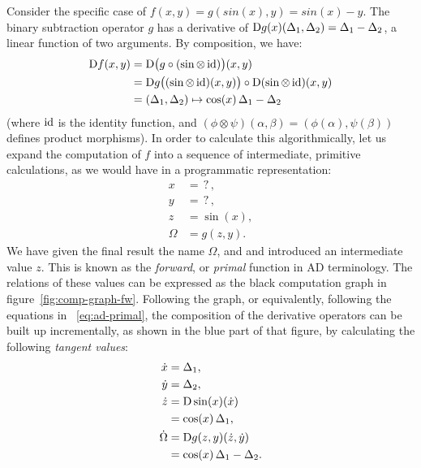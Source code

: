 Consider the specific case of \(f(x, y) = g(sin(x), y) = sin(x) - y\). The binary subtraction
operator \(g\) has a derivative of \(\mathop{}\!\mathrm{D} g(x)(\Delta_1, \Delta_2) = \Delta_1 - \Delta_2\), a linear
function of two arguments.  By composition, we have:
\begin{equation}
  \begin{aligned}
    \mathop{}\!\mathrm{D} f(x, y) &= \mathop{}\!\mathrm{D} \big( g \circ (\sin \otimes \operatorname{id}) \big)(x, y) \\
    &= \mathop{}\!\mathrm{D} g\big( (\sin \otimes \operatorname{id})(x, y) \big) \circ \mathop{}\!\mathrm{D}(\sin \otimes \operatorname{id})(x, y) \\
    &= (\Delta_1, \Delta_2) \mapsto \cos(x) \, \Delta_1 - \Delta_2
  \end{aligned}
\end{equation}
(where \(\operatorname{id}\) is the identity function, and
\((\phi \otimes \psi)(\alpha, \beta) = (\phi(\alpha), \psi(\beta))\) defines product morphisms).  In
order to calculate this algorithmically, let us expand the computation of \(f\) into a sequence of
intermediate, primitive calculations, as we would have in a programmatic representation:
\begin{equation}
  \label{eq:ad-primal}
  \begin{aligned}
    x &= \operatorname{?}, \\
    y &= \operatorname{?}, \\
    z &= \sin(x), \\
    \Omega &= g(z, y).
  \end{aligned}
\end{equation}
We have given the final result the name \(\Omega\), and and introduced an intermediate value \(z\).
This is known as the \emph{forward}, or \emph{primal} function in AD terminology.  The relations of
these values can be expressed as the black computation graph in figure~\ref{fig:comp-graph-fw}.
Following the graph, or equivalently, following the equations in ~\eqref{eq:ad-primal}, the
composition of the derivative operators can be built up incrementally, as shown in the blue part of
that figure, by calculating the following \emph{tangent values}:
\begin{equation}
  \label{eq:ad-forward}
  \begin{aligned}
    \dot{x} &= \Delta_1, \\
    \dot{y} &= \Delta_2, \\
    \dot{z} &= \mathop{}\!\mathrm{D}\sin(x)(\dot{x}) \\
    &= \cos(x) \, \Delta_1, \\
    \dot{\Omega} &= \mathop{}\!\mathrm{D} g(z, y)(\dot{z}, \dot{y}) \\
    &= \cos(x) \, \Delta_1 - \Delta_2.
  \end{aligned}
\end{equation}
